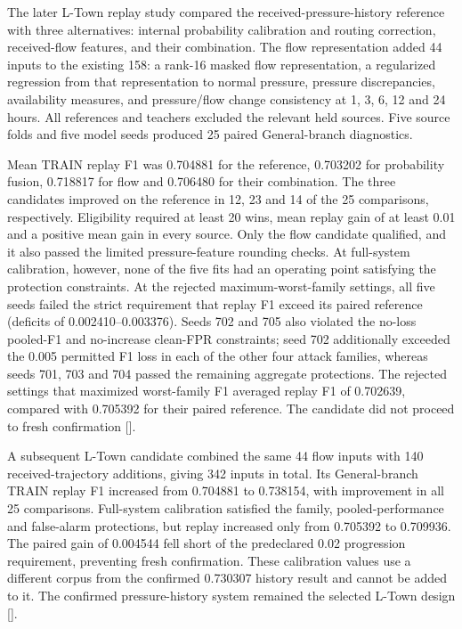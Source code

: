 The later L-Town replay study compared the received-pressure-history reference with three alternatives: internal probability calibration and routing correction, received-flow features, and their combination. The flow representation added 44 inputs to the existing 158: a rank-16 masked flow representation, a regularized regression from that representation to normal pressure, pressure discrepancies, availability measures, and pressure/flow change consistency at 1, 3, 6, 12 and 24 hours. All references and teachers excluded the relevant held sources. Five source folds and five model seeds produced 25 paired General-branch diagnostics.

Mean TRAIN replay F1 was 0.704881 for the reference, 0.703202 for probability fusion, 0.718817 for flow and 0.706480 for their combination. The three candidates improved on the reference in 12, 23 and 14 of the 25 comparisons, respectively. Eligibility required at least 20 wins, mean replay gain of at least 0.01 and a positive mean gain in every source. Only the flow candidate qualified, and it also passed the limited pressure-feature rounding checks. At full-system calibration, however, none of the five fits had an operating point satisfying the protection constraints. At the rejected maximum-worst-family settings, all five seeds failed the strict requirement that replay F1 exceed its paired reference (deficits of 0.002410--0.003376). Seeds 702 and 705 also violated the no-loss pooled-F1 and no-increase clean-FPR constraints; seed 702 additionally exceeded the 0.005 permitted F1 loss in each of the other four attack families, whereas seeds 701, 703 and 704 passed the remaining aggregate protections. The rejected settings that maximized worst-family F1 averaged replay F1 of 0.702639, compared with 0.705392 for their paired reference. The candidate did not proceed to fresh confirmation [].

A subsequent L-Town candidate combined the same 44 flow inputs with 140 received-trajectory additions, giving 342 inputs in total. Its General-branch TRAIN replay F1 increased from 0.704881 to 0.738154, with improvement in all 25 comparisons. Full-system calibration satisfied the family, pooled-performance and false-alarm protections, but replay increased only from 0.705392 to 0.709936. The paired gain of 0.004544 fell short of the predeclared 0.02 progression requirement, preventing fresh confirmation. These calibration values use a different corpus from the confirmed 0.730307 history result and cannot be added to it. The confirmed pressure-history system remained the selected L-Town design [].

